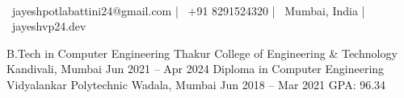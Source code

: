 \documentclass[]{awesome-cv}
\begin{document}
    
\begin{center}
	  \\
	\vspace{2mm}
	{\faEnvelope\ jayeshpotlabattini24@gmail.com} | {\faMobile\ +91 8291524320} | {\faMapMarker\ Mumbai, India} | {\faLink\ jayeshvp24.dev}
\end{center}
\begin{cventries}
	\cventry
	{B.Tech in Computer Engineering}
	{Thakur College of Engineering \& Technology}
	{Kandivali, Mumbai}
	{Jun 2021 – Apr 2024}
	{}
	\cventry
	{Diploma in Computer Engineering}
	{Vidyalankar Polytechnic}
	{Wadala, Mumbai}
	{Jun 2018 – Mar 2021}
	{GPA: 96.34}	
\end{cventries}
\end{document}
